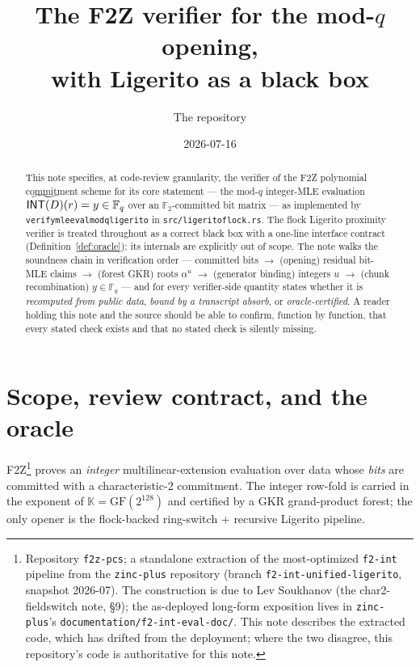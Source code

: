 \documentclass[11pt]{article}
\title{The F2Z verifier for the mod-$q$ opening,\\
  with Ligerito as a black box}
\author{The \code{f2z-pcs} repository}
\date{2026-07-16}
\newcommand{\F}{\mathbb{F}}
\newcommand{\K}{\mathbb{K}}            %
\newcommand{\Ftwo}{\F_2}
\newcommand{\Fq}{\F_q}                 %
\newcommand{\INT}{\mathsf{INT}}
\newcommand{\mle}[1]{\widetilde{#1}}
\newcommand{\code}[1]{{\def\_{\textunderscore\allowbreak}\texttt{#1}}}
\begin{document}
\maketitle

\begin{abstract}
\noindent
This note specifies, at code-review granularity, the verifier of the F2Z
polynomial commitment scheme for its core statement — the mod-$q$
integer-MLE evaluation
$\smash{\mle{\INT(D)}}(r) = y \in \Fq$ over an $\Ftwo$-committed bit
matrix — as implemented by \code{verify\_mle\_eval\_mod\_q\_ligerito} in
\code{src/ligerito\_flock.rs}.  The flock Ligerito proximity verifier is
treated throughout as a correct black box with a one-line interface
contract (Definition~\ref{def:oracle}); its internals are explicitly out
of scope.  The note walks the soundness chain in verification order —
committed bits $\to$ (opening) residual bit-MLE claims $\to$ (forest GKR)
roots $\alpha^{u}$ $\to$ (generator binding) integers $u$ $\to$ (chunk
recombination) $y \in \Fq$ — and for every verifier-side quantity states
whether it is \emph{recomputed from public data}, \emph{bound by a
transcript absorb}, or \emph{oracle-certified}.  A reader holding this
note and the source should be able to confirm, function by function, that
every stated check exists and that no stated check is silently missing.
\end{abstract}

\tableofcontents

\section{Scope, review contract, and the oracle}
\label{sec:scope}

F2Z\footnote{Repository \code{f2z-pcs}; a standalone extraction of the
most-optimized \code{f2-int} pipeline from the \code{zinc-plus} repository
(branch \code{f2-int-unified-ligerito}, snapshot 2026-07).  The
construction is due to Lev Soukhanov (the char2-fieldswitch note, \S9);
the as-deployed long-form exposition lives in
\code{zinc-plus}'s \code{documentation/f2-int-eval-doc/}.  This note
describes the extracted code, which has drifted from the deployment; where
the two disagree, this repository's code is authoritative for this note.}
proves an \emph{integer} multilinear-extension evaluation over data whose
\emph{bits} are committed with a characteristic-2 commitment.  The
integer row-fold is carried in the exponent of $\K = \mathrm{GF}(2^{128})$
and certified by a GKR grand-product forest; the only opener is the
flock-backed ring-switch + recursive Ligerito pipeline.
\end{document}
